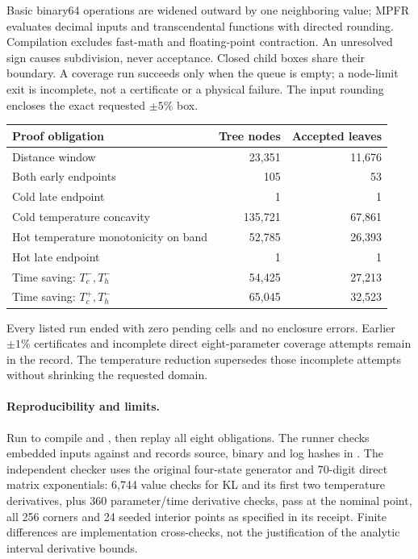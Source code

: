 \documentclass[11pt]{article}
\begin{document}
Basic binary64 operations are widened outward by one neighboring value;
MPFR evaluates decimal inputs and transcendental functions with directed
rounding. Compilation excludes fast-math and floating-point contraction.
An unresolved sign causes subdivision, never acceptance. Closed child
boxes share their boundary. A coverage run succeeds only when the queue
is empty; a node-limit exit is incomplete, not a certificate or a physical
failure. The input rounding encloses the exact requested $\pm5\%$ box.

\begin{center}
\begin{tabular}{lrr}
\toprule
Proof obligation & Tree nodes & Accepted leaves\\
\midrule
Distance window & 23,351 & 11,676\\
Both early endpoints & 105 & 53\\
Cold late endpoint & 1 & 1\\
Cold temperature concavity & 135,721 & 67,861\\
Hot temperature monotonicity on band & 52,785 & 26,393\\
Hot late endpoint & 1 & 1\\
Time saving: $T_c^-,T_h^-$ & 54,425 & 27,213\\
Time saving: $T_c^+,T_h^-$ & 65,045 & 32,523\\
\bottomrule
\end{tabular}
\end{center}
Every listed run ended with zero pending cells and no enclosure errors.
Earlier $\pm1\%$ certificates and incomplete direct eight-parameter
coverage attempts remain in the record. The temperature reduction
supersedes those incomplete attempts without shrinking the requested domain.

\paragraph{Reproducibility and limits.}
Run  to compile
 and
, then replay
all eight obligations. The runner checks embedded inputs against
 and records source, binary and
log hashes in .
The independent checker 
uses the original four-state generator and 70-digit direct matrix
exponentials: 6,744 value checks for KL and its first two temperature
derivatives, plus 360 parameter/time derivative checks, pass at the
nominal point, all 256 corners and 24 seeded interior points as specified
in its receipt. Finite differences are implementation cross-checks, not
the justification of the analytic interval derivative bounds.
\end{document}
